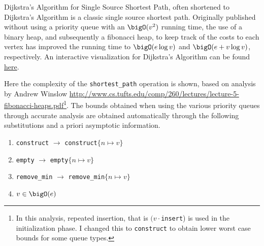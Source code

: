 Dijkstra's Algorithm for Single Source Shortest Path, often shortened to Dijkstra's Algorithm is a classic single source shortest path.  Originally published without using a priority queue with an $\bigO(v^2)$ running time, the use of a binary heap, and subsequently a fibonacci heap, to keep track of the costs to each vertex has improved the running time to $\bigO(e \log v)$ and $\bigO(e + v \log v)$, respectively.  An interactive visualization for Dijkstra's Algorithm can be found \href{http://www.cs.usfca.edu/~galles/visualization/Dijkstra.html}{here}.

\par
\bigskip

Here the complexity of the \texttt{shortest\_path} operation is shown, based on analysis by Andrew Winslow \url{http://www.cs.tufts.edu/comp/260/lectures/lecture-5-fibonacci-heaps.pdf}\footnote{In this analysis, repeated insertion, that is $(v \cdot $\texttt{insert}) is used in the initialization phase.  I changed this to \texttt{construct} to obtain lower worst case bounds for some queue types.}.  The bounds obtained when using the various priority queues through accurate analysis are obtained automatically through the following substitutions and a priori asymptotic information.

\begin{enumerate}[1.]

\item \texttt{construct} $\rightarrow$ \texttt{construct}$\{n \mapsto v\}$
\item \texttt{empty} $\rightarrow$ \texttt{empty}$\{n \mapsto v\}$
\item \texttt{remove\_min} $\rightarrow$ \texttt{remove\_min}$\{n \mapsto v\}$
\item $v \in \bigO(e)$

\end{enumerate}
